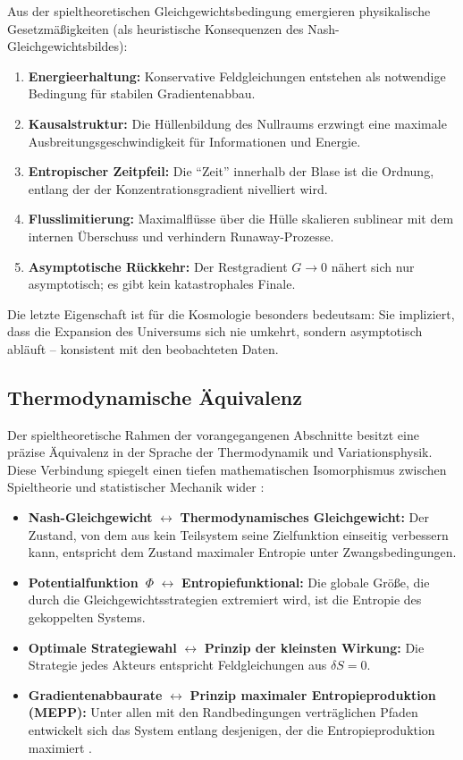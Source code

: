 \documentclass[aps,prd,twocolumn,superscriptaddress,nofootinbib]{revtex4-2}
\begin{document}
Aus der spieltheoretischen Gleichgewichtsbedingung emergieren physikalische Gesetzmäßigkeiten (als heuristische Konsequenzen des Nash-Gleichgewichtsbildes):

\begin{enumerate}
\item \textbf{Energieerhaltung:} Konservative Feldgleichungen entstehen als notwendige Bedingung für stabilen Gradientenabbau.
\item \textbf{Kausalstruktur:} Die Hüllenbildung des Nullraums erzwingt eine maximale Ausbreitungsgeschwindigkeit für Informationen und Energie.
\item \textbf{Entropischer Zeitpfeil:} Die ``Zeit'' innerhalb der Blase ist die Ordnung, entlang der der Konzentrationsgradient nivelliert wird.
\item \textbf{Flusslimitierung:} Maximalflüsse über die Hülle skalieren sublinear mit dem internen Überschuss und verhindern Runaway-Prozesse.
\item \textbf{Asymptotische Rückkehr:} Der Restgradient $G \to 0$ nähert sich nur asymptotisch; es gibt kein katastrophales Finale.
\end{enumerate}

Die letzte Eigenschaft ist für die Kosmologie besonders bedeutsam: Sie impliziert, dass die Expansion des Universums sich nie umkehrt, sondern asymptotisch abläuft -- konsistent mit den beobachteten Daten.

\subsection{Thermodynamische Äquivalenz}
\label{subsec:thermodynamic}

Der spieltheoretische Rahmen der vorangegangenen Abschnitte besitzt eine präzise Äquivalenz in der Sprache der Thermodynamik und Variationsphysik. Diese Verbindung spiegelt einen tiefen mathematischen Isomorphismus zwischen Spieltheorie und statistischer Mechanik wider \cite{Wolpert2006}:

\begin{itemize}
\item \textbf{Nash-Gleichgewicht} $\leftrightarrow$ \textbf{Thermodynamisches Gleichgewicht:} Der Zustand, von dem aus kein Teilsystem seine Zielfunktion einseitig verbessern kann, entspricht dem Zustand maximaler Entropie unter Zwangsbedingungen.
\item \textbf{Potentialfunktion~$\Phi$} $\leftrightarrow$ \textbf{Entropiefunktional:} Die globale Größe, die durch die Gleichgewichtsstrategien extremiert wird, ist die Entropie des gekoppelten Systems.
\item \textbf{Optimale Strategiewahl} $\leftrightarrow$ \textbf{Prinzip der kleinsten Wirkung:} Die Strategie jedes Akteurs entspricht Feldgleichungen aus $\delta S = 0$.
\item \textbf{Gradientenabbaurate} $\leftrightarrow$ \textbf{Prinzip maximaler Entropieproduktion (MEPP):} Unter allen mit den Randbedingungen verträglichen Pfaden entwickelt sich das System entlang desjenigen, der die Entropieproduktion maximiert \cite{Dewar2003}.
\end{itemize}
\end{document}
